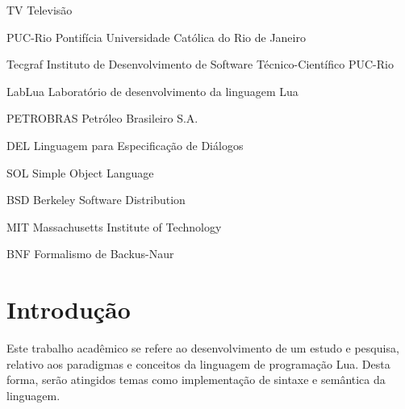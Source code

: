 \documentclass[
12pt, %
openright, %
oneside, %
a4paper, %
english, %
brazil, %
]{abntex2}
\begin{document}

\begin{siglas}
  \item[TV] Televisão 
  \item[PUC-Rio] Pontifícia Universidade Católica do Rio de Janeiro
  \item[Tecgraf] Instituto de Desenvolvimento de Software Técnico-Científico PUC-Rio
  \item[LabLua] Laboratório de desenvolvimento da linguagem Lua
  \item[PETROBRAS]  Petróleo Brasileiro S.A. 
  \item[DEL] Linguagem para Especificação de Diálogos 
  \item[SOL] Simple Object Language
  \item[BSD] Berkeley Software Distribution 
  \item[MIT] Massachusetts Institute of Technology
  \item[BNF] Formalismo de Backus-Naur
\end{siglas}


\tableofcontents*
\cleardoublepage

\textual

\chapter{Introdução}
Este trabalho acadêmico se refere ao desenvolvimento de um estudo e pesquisa, relativo aos paradigmas e conceitos da linguagem de programação Lua. Desta forma, serão atingidos temas como implementação de sintaxe e semântica da linguagem.
\end{document}
